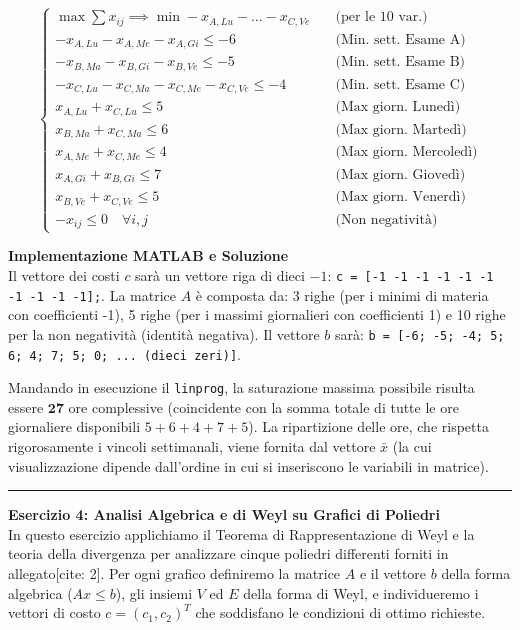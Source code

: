 \documentclass[12pt, a4paper]{article}
\begin{document}
	\[
	\begin{cases}
		\max \sum x_{ij} \implies \min -x_{A,Lu} - \dots - x_{C,Ve} \quad &\text{(per le 10 var.)} \\[6pt]
		-x_{A,Lu} - x_{A,Me} - x_{A,Gi} \leq -6 &\text{(Min. sett. Esame A)} \\
		-x_{B,Ma} - x_{B,Gi} - x_{B,Ve} \leq -5 &\text{(Min. sett. Esame B)} \\
		-x_{C,Lu} - x_{C,Ma} - x_{C,Me} - x_{C,Ve} \leq -4 &\text{(Min. sett. Esame C)} \\[6pt]
		x_{A,Lu} + x_{C,Lu} \leq 5 &\text{(Max giorn. Lunedì)} \\
		x_{B,Ma} + x_{C,Ma} \leq 6 &\text{(Max giorn. Martedì)} \\
		x_{A,Me} + x_{C,Me} \leq 4 &\text{(Max giorn. Mercoledì)} \\
		x_{A,Gi} + x_{B,Gi} \leq 7 &\text{(Max giorn. Giovedì)} \\
		x_{B,Ve} + x_{C,Ve} \leq 5 &\text{(Max giorn. Venerdì)} \\[6pt]
		-x_{ij} \leq 0 \quad \forall i,j &\text{(Non negatività)}
	\end{cases}
	\]
	
	\textbf{Implementazione MATLAB e Soluzione}\\
	Il vettore dei costi $c$ sarà un vettore riga di dieci $-1$: \texttt{c = [-1 -1 -1 -1 -1 -1 -1 -1 -1 -1];}.
	La matrice $A$ è composta da: 3 righe (per i minimi di materia con coefficienti -1), 5 righe (per i massimi giornalieri con coefficienti 1) e 10 righe per la non negatività (identità negativa).
	Il vettore $b$ sarà: \texttt{b = [-6; -5; -4; 5; 6; 4; 7; 5; 0; ... (dieci zeri)]}.
	
	Mandando in esecuzione il \texttt{linprog}, la saturazione massima possibile risulta essere $\mathbf{27}$ ore complessive (coincidente con la somma totale di tutte le ore giornaliere disponibili $5+6+4+7+5$). La ripartizione delle ore, che rispetta rigorosamente i vincoli settimanali, viene fornita dal vettore $\bar{x}$ (la cui visualizzazione dipende dall'ordine in cui si inseriscono le variabili in matrice).
	
	\vspace{0.8cm}
	\hrule
	\vspace{0.4cm}
	
	\textbf{Esercizio 4: Analisi Algebrica e di Weyl su Grafici di Poliedri}\\
	In questo esercizio applichiamo il Teorema di Rappresentazione di Weyl e la teoria della divergenza per analizzare cinque poliedri differenti forniti in allegato[cite: 2]. Per ogni grafico definiremo la matrice $A$ e il vettore $b$ della forma algebrica ($Ax \leq b$), gli insiemi $V$ ed $E$ della forma di Weyl, e individueremo i vettori di costo $c = (c_1, c_2)^T$ che soddisfano le condizioni di ottimo richieste.
	
\end{document}
